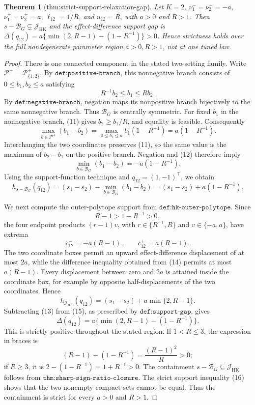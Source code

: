 \documentclass{article}
\newtheorem{theorem}{Theorem}
\begin{document}
\begin{theorem}[thm:strict-support-relaxation-gap]\label{thm:strict-support-relaxation-gap}
Let \(K=2\), \(\nu^-_1=\nu^-_2=-a\), \(\nu^+_1=\nu^+_2=a\), \(\ell_{12}=1/R\), and \(u_{12}=R\), with \(a>0\) and \(R>1\). Then \(s-\mathcal B_G\subsetneq\mathcal J_{\mathrm{HK}}\) and the effect-difference support gap is \(\Delta(q_{12})=a\{\min(2,R-1)-(1-R^{-1})\}>0\). Hence strictness holds over the full nondegenerate parameter region \(a>0,R>1\), not at one tuned law.
\end{theorem}
\begin{proof}
There is one connected component in the stated two-setting family.  Write \(\mathcal P^+=\mathcal P_{\{1,2\}}^+\).  By \(\texttt{def:positive-branch}\), this nonnegative branch consists of \(0\le b_1,b_2\le a\) satisfying
\[
 R^{-1}b_2\le b_1\le Rb_2.
\tag{11}
\]
By \(\texttt{def:negative-branch}\), negation maps its nonpositive branch bijectively to the same nonnegative branch.  Thus \(\mathcal B_G\) is centrally symmetric.  For fixed \(b_1\) in the nonnegative branch, (11) gives \(b_2\ge b_1/R\), and equality is feasible.  Consequently
\[
 \max_{b\in\mathcal P^+}(b_1-b_2)
 =\max_{0\le b_1\le a}b_1(1-R^{-1})
 =a(1-R^{-1}).
\tag{12}
\]
Interchanging the two coordinates preserves (11), so the same value is the maximum of \(b_2-b_1\) on the positive branch.  Negation and (12) therefore imply
\[
 \min_{b\in\mathcal B_G}(b_1-b_2)=-a(1-R^{-1}).
\]
Using the support-function technique and \(q_{12}=(1,-1)^{\top}\), we obtain
\[
 h_{s-\mathcal B_G}(q_{12})
 =(s_1-s_2)-\min_{b\in\mathcal B_G}(b_1-b_2)
 =(s_1-s_2)+a(1-R^{-1}).
\tag{13}
\]

We next compute the outer-polytope support from \(\texttt{def:hk-outer-polytope}\).  Since
\[
 R-1>1-R^{-1}>0,
\]
the four endpoint products \((r-1)v\), with \(r\in\{R^{-1},R\}\) and \(v\in\{-a,a\}\), have extrema
\[
 c_{12}^-=-a(R-1),
 \qquad
 c_{12}^+=a(R-1).
\tag{14}
\]
The two coordinate boxes permit an upward effect-difference displacement of at most \(2a\), while the difference inequality obtained from (14) permits at most \(a(R-1)\).  Every displacement between zero and \(2a\) is attained inside the coordinate box, for example by opposite half-displacements of the two coordinates.  Hence
\[
 h_{\mathcal J_{\mathrm{HK}}}(q_{12})
 =(s_1-s_2)+a\min\{2,R-1\}.
\tag{15}
\]
Subtracting (13) from (15), as prescribed by \(\texttt{def:support-gap}\), gives
\[
 \Delta(q_{12})
 =a\{\min(2,R-1)-(1-R^{-1})\}.
\tag{16}
\]
This is strictly positive throughout the stated region.  If \(1<R\le3\), the expression in braces is
\[
 (R-1)-(1-R^{-1})=\frac{(R-1)^2}{R}>0;
\]
if \(R\ge3\), it is \(2-(1-R^{-1})=1+R^{-1}>0\).  The containment \(s-\mathcal B_G\subseteq\mathcal J_{\mathrm{HK}}\) follows from \(\texttt{thm:sharp-sign-ratio-closure}\).  The strict support inequality (16) shows that the two nonempty compact sets cannot be equal.  Thus the containment is strict for every \(a>0\) and \(R>1\).
\end{proof}
\end{document}
